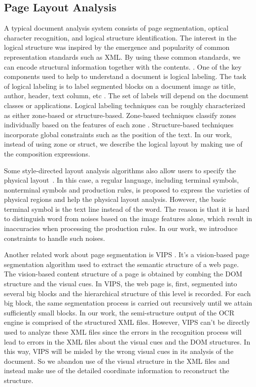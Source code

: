 \subsection{Page Layout Analysis}
A typical document analysis system consists of page segmentation, 
optical character recognition, and logical structure identification. 
The interest in the logical structure was inspired by the 
emergence and popularity of common representation standards such as XML. 
By using these common standards, we can encode structural information 
together with the contents. \cite{o1993document}. 
One of the key components used to help to understand a document is logical 
labeling. 
The task of logical labeling is to label segmented blocks on a document 
image as title, author, header, text column, etc \cite{liang2002logical}. 
The set of labels will depend on the document classes or applications. 
Logical labeling techniques can be roughly characterized as either 
zone-based or structure-based. Zone-based 
techniques classify zones individually based on the features of each zone 
\cite{altamura2001transforming} \cite{palmero1999structured}. 
Structure-based techniques incorporate global constraints such as the position 
of the text. 
In our work, instead of using zone or struct, 
we describe the logical layout by making 
use of the composition expressions. 

Some style-directed layout analysis algorithms 
also allow users to specify the physical layout~\cite{kanungo2003stochastic}.
In this case, a regular language, including terminal symbols, 
nonterminal symbols and production rules, is proposed to express 
the varieties of physical regions and help the physical layout analysis.
However, the basic terminal symbol is the text line instead of the word. 
The reason is that it is hard to distinguish word from noises based on the 
image features alone, which result in inaccuracies when processing 
the production rules. In our work, we introduce constraints to 
handle such noises.  

Another related work about page segmentation is VIPS \cite{cai2003vips}. 
It's a vision-based page segmentation algorithm used to extract the semantic 
structure of a web page. 
The vision-based content structure of a page is obtained by combing the DOM structure 
and the visual cues. In VIPS, the web page is, first, segmented into 
several big blocks and the hierarchical structure of this level is 
recorded. For each big block, the same segmentation process is 
carried out recursively until we attain sufficiently small blocks. 
In our work, the semi-structure output of the OCR engine is comprised of the 
structured XML files. However, VIPS can't be directly used to analyze 
these XML files since the errors in the recognition process will 
lead to errors in the XML files about the visual cues 
and the DOM structures. In this way, VIPS will be misled by 
the wrong visual cues in its analysis of the document. So 
we abandon use of the visual structure in the XML files and instead 
make use of the detailed coordinate information to reconstruct the 
structure. 

